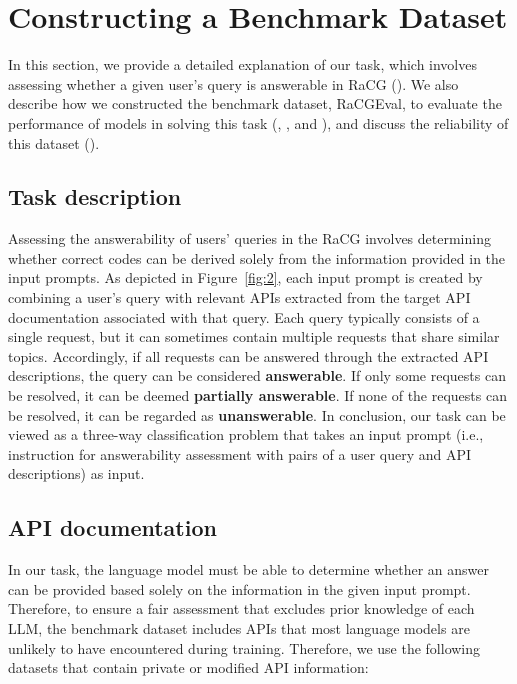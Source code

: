 \section{Constructing a Benchmark Dataset}
In this section, we provide a detailed explanation of our task, which involves assessing whether a given user's query is answerable in RaCG (). We also describe how we constructed the benchmark dataset, RaCGEval, to evaluate the performance of models in solving this task (, , and ), and discuss the reliability of this dataset ().



\subsection{Task description}
\label{sec:2_1}
Assessing the answerability of users' queries in the RaCG involves determining whether correct codes can be derived solely from the information provided in the input prompts. As depicted in Figure~\ref{fig:2}, each input prompt is created by combining a user's query with relevant APIs extracted from the target API documentation associated with that query. Each query typically consists of a single request, but it can sometimes contain multiple requests that share similar topics. Accordingly, if all requests can be answered through the extracted API descriptions, the query can be considered \textbf{answerable}. If only some requests can be resolved, it can be deemed \textbf{partially answerable}. If none of the requests can be resolved, it can be regarded as \textbf{unanswerable}. In conclusion, our task can be viewed as a three-way classification problem that takes an input prompt (i.e., instruction for answerability assessment with pairs of a user query and API descriptions) as input.

\subsection{API documentation}
\label{sec:2_2}
In our task, the language model must be able to determine whether an answer can be provided based solely on the information in the given input prompt. Therefore, to ensure a fair assessment that excludes prior knowledge of each LLM, the benchmark dataset includes APIs that most language models are unlikely to have encountered during training. Therefore, we use the following datasets that contain private or modified API information:

